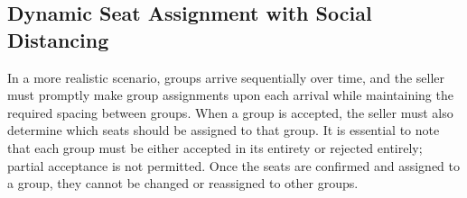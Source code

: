 





\subsection{Dynamic Seat Assignment with Social Distancing}\label{sec_dynamic}
In a more realistic scenario, groups arrive sequentially over time, and the seller must promptly make group assignments upon each arrival while maintaining the required spacing between groups. When a group is accepted, the seller must also determine which seats should be assigned to that group. It is essential to note that each group must be either accepted in its entirety or rejected entirely; partial acceptance is not permitted. Once the seats are confirmed and assigned to a group, they cannot be changed or reassigned to other groups.

